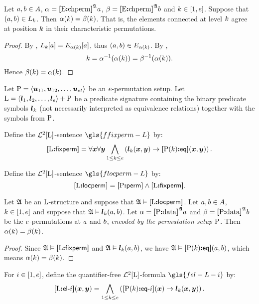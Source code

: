 \begin{remark}\label{rem:local-lvl-agree}
Let $a, b \in A$, $\alpha = {\bm{[}{\mathrm{E}}\mathord{\bm{:}}\mathrm{chperm}\bm{]}}^{\mathfrak{A}}a$,
$\beta = {\bm{[}{\mathrm{E}}\mathord{\bm{:}}\mathrm{chperm}\bm{]}}^{\mathfrak{A}}b$ and $k \in [1,e]$.
Suppose that $(a, b) \in L_{k}$.
Then $\alpha(k) = \beta(k)$.
That is, the elements connected at level $k$ agree at position $k$ in their
characteristic permutations.
\end{remark}
\begin{proof}
By , $L_{k}[a] = E_{\alpha(k)}[a]$, thus
$(a, b) \in E_{\alpha(k)}$. 
By ,
\[
  k = \alpha^{-1}(\alpha(k)) = \beta^{-1}(\alpha(k)).
\]
Hence $\beta(k) = \alpha(k)$.
\end{proof}

Let ${\mathrm{P}} = \left\langle \bm{u}_{11}, \bm{u}_{12}, \dots, \bm{u}_{et} \right\rangle$ be an
$e$-permutation setup.
Let ${\mathrm{L}} = \left\langle \bm{l}_{1}, \bm{l}_{2}, \dots, \bm{l}_{e} \right\rangle + {\mathrm{P}}$ be a predicate
signature containing the binary predicate symbols $\bm{l}_{k}$ (not necessarily
interpreted as equivalence relations) together with the symbols from ${\mathrm{P}}$.
\begin{definition}
Define the $\mathcal{L}^{2}[{\mathrm{L}}]$-sentence $\gls{ffixperm-L}$ by:
\[
  {\bm{[}{\mathrm{L}}\mathord{\bm{:}}\mathsf{fixperm}\bm{]}} = \forall\bm{x} \forall\bm{y} \bigwedge_{1 \leq k \leq e}
  \left(\bm{l}_{k}(\bm{x},\bm{y}) \rightarrow {\bm{[}{\mathrm{P}}(k)\mathord{\bm{:}}\mathsf{eq}\bm{]}}(\bm{x},\bm{y})\right).
\]
\end{definition}
\begin{definition}
Define the $\mathcal{L}^{2}[{\mathrm{L}}]$-sentence $\gls{flocperm-L}$ by:
\[
  {\bm{[}{\mathrm{L}}\mathord{\bm{:}}\mathsf{locperm}\bm{]}} = {\bm{[}{\mathrm{P}}\mathord{\bm{:}}\mathsf{perm}\bm{]}} \land {\bm{[}{\mathrm{L}}\mathord{\bm{:}}\mathsf{fixperm}\bm{]}}.
\]
\end{definition}
\begin{remark}\label{rem:local-perm-val-fixed}
Let $\mathfrak{A}$ be an ${\mathrm{L}}$-structure and suppose that $\mathfrak{A} \vDash {\bm{[}{\mathrm{L}}\mathord{\bm{:}}\mathsf{locperm}\bm{]}}$.
Let $a, b \in A$, $k \in [1,e]$ and suppose that
$\mathfrak{A} \vDash \bm{l}_{k}(a, b)$.
Let $\alpha = {\bm{[}{\mathrm{P}}\mathord{\bm{:}}\mathrm{data}\bm{]}}^{\mathfrak{A}}a$ and $\beta = {\bm{[}{\mathrm{P}}\mathord{\bm{:}}\mathrm{data}\bm{]}}^{\mathfrak{A}}b$ be the
$e$-permutations at $a$ and $b$,
\emph{encoded by the permutation setup ${\mathrm{P}}$}.
Then $\alpha(k) = \beta(k)$.
\end{remark}
\begin{proof}
Since $\mathfrak{A} \vDash {\bm{[}{\mathrm{L}}\mathord{\bm{:}}\mathsf{fixperm}\bm{]}}$ and $\mathfrak{A} \vDash \bm{l}_{k}(a,b)$, we have
$\mathfrak{A} \vDash {\bm{[}{\mathrm{P}}(k)\mathord{\bm{:}}\mathsf{eq}\bm{]}}(a,b)$, which means $\alpha(k) =
\beta(k)$.
\end{proof}

\begin{definition}
For $i \in [1,e]$, define the quantifier-free $\mathcal{L}^{2}[{\mathrm{L}}]$-formula
$\gls{fel-L-i}$ by:
\[
  {\bm{[}{\mathrm{L}}\mathord{\bm{:}}\mathsf{el}{\hbox{-}}i\bm{]}}(\bm{x},\bm{y}) = \bigwedge_{1 \leq k \leq e}
  \left({\bm{[}{\mathrm{P}}(k)\mathord{\bm{:}}\mathsf{eq}{\hbox{-}}i\bm{]}}(\bm{x}) \rightarrow \bm{l}_{k}(\bm{x},\bm{y})\right).
\]
\end{definition}


